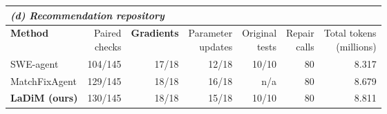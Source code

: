 \par\vspace{5pt}
\begin{tabular*}{\linewidth}{@{\extracolsep{\fill}}lrrrrrr@{}}
\toprule
\multicolumn{7}{l}{\textit{(d) Recommendation repository}} \\
\midrule
\textbf{Method} & \thead{Paired\\checks} & \textbf{Gradients} & \thead{Parameter\\updates} & \thead{Original\\tests} & \thead{Repair\\calls} & \thead{Total tokens\\(millions)} \\
\midrule
SWE-agent & 104/145 & 17/18 & 12/18 & 10/10 & 80 & 8.317 \\
MatchFixAgent & 129/145 & 18/18 & 16/18 & n/a & 80 & 8.679 \\
\textbf{LaDiM (ours)} & 130/145 & 18/18 & 15/18 & 10/10 & 80 & 8.811 \\
\bottomrule
\end{tabular*}
